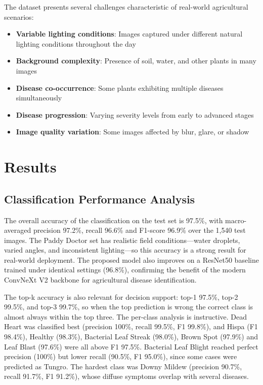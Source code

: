 \documentclass[pdflatex,sn-mathphys-num]{sn-jnl}%
\begin{document}
The dataset presents several challenges characteristic of real-world agricultural scenarios:

\begin{itemize}
    \item \textbf{Variable lighting conditions}: Images captured under different natural lighting conditions throughout the day
    \item \textbf{Background complexity}: Presence of soil, water, and other plants in many images
    \item \textbf{Disease co-occurrence}: Some plants exhibiting multiple diseases simultaneously
    \item \textbf{Disease progression}: Varying severity levels from early to advanced stages
    \item \textbf{Image quality variation}: Some images affected by blur, glare, or shadow
\end{itemize}

\section{Results}\label{sec:results}

\subsection{Classification Performance Analysis}\label{subsec:classification-performance}

The overall accuracy of the classification on the test set is 97.5\%, with macro-averaged precision 97.2\%, recall 96.6\% and F1-score 96.9\% over the 1{,}540 test images. The Paddy Doctor set has realistic field conditions---water droplets, varied angles, and inconsistent lighting---so this accuracy is a strong result for real-world deployment. The proposed model also improves on a ResNet50 baseline trained under identical settings (96.8\%), confirming the benefit of the modern ConvNeXt V2 backbone for agricultural disease identification.

The top-k accuracy is also relevant for decision support: top-1 97.5\%, top-2 99.5\%, and top-3 99.7\%, so when the top prediction is wrong the correct class is almost always within the top three. The per-class analysis is instructive. Dead Heart was classified best (precision 100\%, recall 99.5\%, F1 99.8\%), and Hispa (F1 98.4\%), Healthy (98.3\%), Bacterial Leaf Streak (98.0\%), Brown Spot (97.9\%) and Leaf Blast (97.6\%) were all above F1 97.5\%. Bacterial Leaf Blight reached perfect precision (100\%) but lower recall (90.5\%, F1 95.0\%), since some cases were predicted as Tungro. The hardest class was Downy Mildew (precision 90.7\%, recall 91.7\%, F1 91.2\%), whose diffuse symptoms overlap with several diseases.
\end{document}
